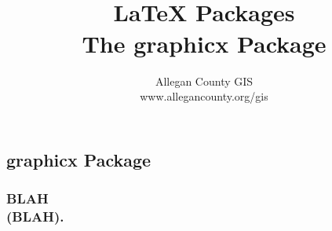 \documentclass[class=report , crop=false, multi={itemize, figure}, float=false]{standalone}
\title{ %
\HRule %
\\[.4cm] %
	\Huge \bfseries \LaTeX{} Packages\\ \medskip\large The graphicx Package %
\HRule \\[.4cm] %
}  %
\author{\Large Allegan County GIS \\\Large www.allegancounty.org/gis} %
\begin{document}

\ifstandalone
\maketitle %
\tableofcontents %
\clearpage
\fi



\subsection{graphicx Package}
	\medskip 
	\subsubsection{\Large BLAH \\\small(BLAH).}
	
	
\end{document}
